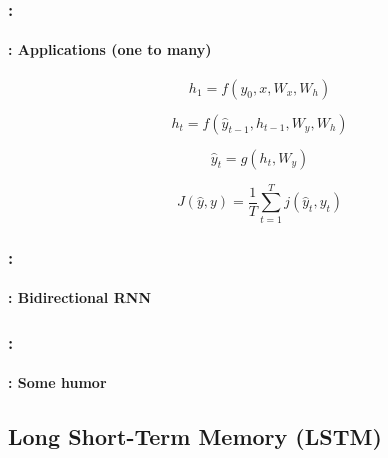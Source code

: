 \documentclass[xcolor=table]{beamer}
\begin{document}
\begin{frame}
	\frametitle{\insertshortsubtitle: \insertsection}
	\framesubtitle{\insertsubsection: Applications (one to many)}
	
	
	
	\begin{minipage}{0.4\textwidth}
		
		\[h_1  = f(y_{0}, x, W_x, W_h)\]
		
		\[h_{t} = f(\hat{y}_{t-1}, h_{t-1}, W_y, W_h)\]
		
		\[\hat{y}_{t} = g(h_{t}, W_y)\]
		
		\[ J(\hat{y}, y) = \frac{1}{T} \sum_{t=1}^{T} j(\hat{y}_{t}, y_t)\]
	\end{minipage}
	\begin{minipage}{0.58\textwidth}
	\end{minipage}

\end{frame}

\begin{frame}
	\frametitle{\insertshortsubtitle: \insertsection}
	\framesubtitle{\insertsubsection: Bidirectional RNN}
	
	\begin{center}
	\end{center}
	
\end{frame}

\begin{frame}
	\frametitle{\insertshortsubtitle: \insertsection}
	\framesubtitle{\insertsubsection: Some humor}
	
	\begin{center}
	\end{center}
	
\end{frame}


\subsection{Long Short-Term Memory (LSTM)}
\end{document}
